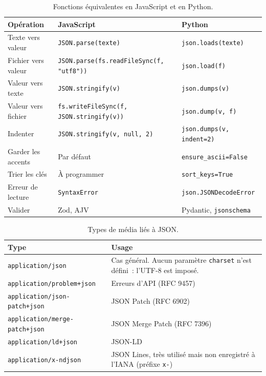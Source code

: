 \documentclass[12pt,a4paper]{article}
\begin{document}
\begin{table}[H]
\centering
\footnotesize
\begin{tabularx}{\textwidth}{lXX}
\toprule
\textbf{Opération} & \textbf{JavaScript} & \textbf{Python} \\
\midrule
Texte vers valeur & \texttt{JSON.parse(texte)} & \texttt{json.loads(texte)} \\
Fichier vers valeur & \texttt{JSON.parse(}\allowbreak\texttt{fs.readFileSync(f, "utf8"))} & \texttt{json.load(f)} \\
Valeur vers texte & \texttt{JSON.stringify(v)} & \texttt{json.dumps(v)} \\
Valeur vers fichier & \texttt{fs.writeFileSync(}\allowbreak\texttt{f, JSON.stringify(v))} & \texttt{json.dump(v, f)} \\
Indenter & \texttt{JSON.stringify(v, null, 2)} & \texttt{json.dumps(v, indent=2)} \\
Garder les accents & Par défaut & \texttt{ensure\_ascii=False} \\
Trier les clés & À programmer & \texttt{sort\_keys=True} \\
Erreur de lecture & \texttt{SyntaxError} & \texttt{json.JSONDecodeError} \\
Valider & Zod, AJV & Pydantic, \texttt{jsonschema} \\
\bottomrule
\end{tabularx}
\caption{Fonctions équivalentes en JavaScript et en Python.}
\label{tab:memento}
\end{table}

\begin{table}[H]
\centering
\footnotesize
\begin{tabularx}{\textwidth}{lX}
\toprule
\textbf{Type} & \textbf{Usage} \\
\midrule
\texttt{application/json} & Cas général. Aucun paramètre \texttt{charset} n'est défini~: l'UTF-8 est imposé. \\
\texttt{application/problem+json} & Erreurs d'API (RFC 9457) \\
\texttt{application/json-patch+json} & JSON Patch (RFC 6902) \\
\texttt{application/merge-patch+json} & JSON Merge Patch (RFC 7396) \\
\texttt{application/ld+json} & JSON-LD \\
\texttt{application/x-ndjson} & JSON Lines, très utilisé mais non enregistré à l'IANA (préfixe \texttt{x-}) \\
\bottomrule
\end{tabularx}
\caption{Types de média liés à JSON.}
\label{tab:media}
\end{table}
\end{document}
